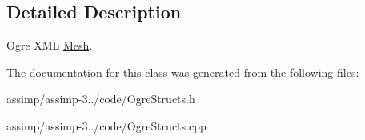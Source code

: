 \subsection{Detailed Description}
Ogre X\+M\+L \hyperlink{class_assimp_1_1_ogre_1_1_mesh}{Mesh}. 

The documentation for this class was generated from the following files\+:\begin{DoxyCompactItemize}
\item 
assimp/assimp-\/3../code/Ogre\+Structs.\+h\item 
assimp/assimp-\/3../code/Ogre\+Structs.\+cpp\end{DoxyCompactItemize}
